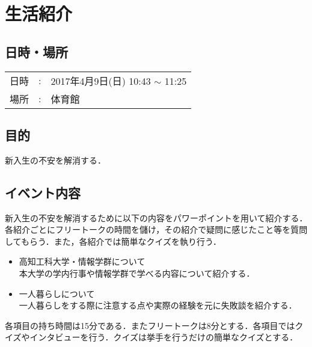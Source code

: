 \documentclass[a4j,titlepage]{jarticle}
\begin{document}
\section{生活紹介}

\subsection{日時・場所}

\begin{tabular}{p{}rp{}}
  日時 & : & 2017年4月9日(日) 10:43 $\sim$ 11:25 \\ %
  場所 & : & 体育館
\end{tabular}

\subsection{目的}
新入生の不安を解消する．

\subsection{イベント内容}
新入生の不安を解消するために以下の内容をパワーポイントを用いて紹介する．各紹介ごとにフリートークの時間を儲け，その紹介で疑問に感じたこと等を質問してもらう．また，各紹介では簡単なクイズを執り行う．

\begin{itemize}
\item 高知工科大学・情報学群について \\
  本大学の学内行事や情報学群で学べる内容について紹介する．
\item 一人暮らしについて \\
  一人暮らしをする際に注意する点や実際の経験を元に失敗談を紹介する．
\end{itemize}

各項目の持ち時間は15分である．またフリートークは8分とする．各項目ではクイズやインタビューを行う．クイズは挙手を行うだけの簡単なクイズとする．
\end{document}
